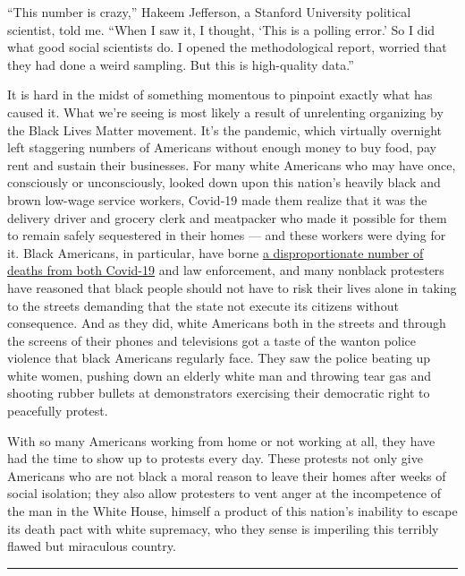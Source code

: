 ``This number is crazy,'' Hakeem Jefferson, a Stanford University
political scientist, told me. ``When I saw it, I thought, `This is a
polling error.' So I did what good social scientists do. I opened the
methodological report, worried that they had done a weird sampling. But
this is high-quality data.''

It is hard in the midst of something momentous to pinpoint exactly what
has caused it. What we're seeing is most likely a result of unrelenting
organizing by the Black Lives Matter movement. It's the pandemic, which
virtually overnight left staggering numbers of Americans without enough
money to buy food, pay rent and sustain their businesses. For many white
Americans who may have once, consciously or unconsciously, looked down
upon this nation's heavily black and brown low-wage service workers,
Covid-19 made them realize that it was the delivery driver and grocery
clerk and meatpacker who made it possible for them to remain safely
sequestered in their homes --- and these workers were dying for it.
Black Americans, in particular, have borne
\href{https://www.apmresearchlab.org/covid/deaths-by-race}{a
disproportionate number of deaths from both Covid-19} and law
enforcement, and many nonblack protesters have reasoned that black
people should not have to risk their lives alone in taking to the
streets demanding that the state not execute its citizens without
consequence. And as they did, white Americans both in the streets and
through the screens of their phones and televisions got a taste of the
wanton police violence that black Americans regularly face. They saw the
police beating up white women, pushing down an elderly white man and
throwing tear gas and shooting rubber bullets at demonstrators
exercising their democratic right to peacefully protest.

With so many Americans working from home or not working at all, they
have had the time to show up to protests every day. These protests not
only give Americans who are not black a moral reason to leave their
homes after weeks of social isolation; they also allow protesters to
vent anger at the incompetence of the man in the White House, himself a
product of this nation's inability to escape its death pact with white
supremacy, who they sense is imperiling this terribly flawed but
miraculous country.

\begin{center}\rule{0.5\linewidth}{\linethickness}\end{center}

